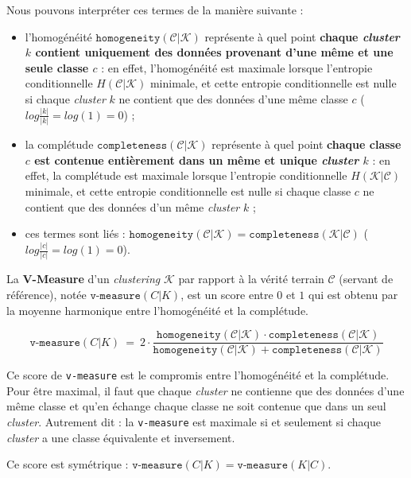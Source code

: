 		\begin{leftBarAuthorOpinion}
			Nous pouvons interpréter ces termes de la manière suivante :
			\begin{itemize}
				\item l'homogénéité $\texttt{homogeneity}(\mathcal{C}|\mathcal{K})$ représente à quel point \textbf{chaque \textit{cluster} $k$ contient uniquement des données provenant d'une même et une seule classe $c$} :
				en effet, l'homogénéité est maximale lorsque l'entropie conditionnelle $H(\mathcal{C}|\mathcal{K})$ minimale, et cette entropie conditionnelle est nulle si chaque \textit{cluster} $k$ ne contient que des données d'une même classe $c$ ($log \frac{|k|}{|k|}=log(1)=0$) ;
				\item la complétude $\texttt{completeness}(\mathcal{C}|\mathcal{K})$ représente à quel point \textbf{chaque classe $c$ est contenue entièrement dans un même et unique \textit{cluster} $k$} :
				en effet, la complétude est maximale lorsque l'entropie conditionnelle $H(\mathcal{K}|\mathcal{C})$ minimale, et cette entropie conditionnelle est nulle si chaque classe $c$ ne contient que des données d'un même \textit{cluster} $k$ ;
				\item ces termes sont liés : $\texttt{homogeneity}(\mathcal{C}|\mathcal{K}) = \texttt{completeness}(\mathcal{K}|\mathcal{C})$ ($log \frac{|c|}{|c|}=log(1)=0$).
			\end{itemize}
		\end{leftBarAuthorOpinion}
		
		
		La \textbf{V-Measure} d'un \textit{clustering} $\mathcal{K}$ par rapport à la vérité terrain $\mathcal{C}$ (servant de référence), notée $\texttt{v-measure}(C|K)$, est un score entre $0$ et $1$ qui est obtenu par la moyenne harmonique entre l'homogénéité et la complétude.
		
		\begin{equation}
			\label{equation:D.1-ANNEXE-EVALUATION-CLUSTERING-DEFINITION-VMEASURE}
			\texttt{v-measure}(C|K)~=~2 \cdot \frac{
				\texttt{homogeneity}(\mathcal{C}|\mathcal{K}) \cdot \texttt{completeness}(\mathcal{C}|\mathcal{K})
			}{
				\texttt{homogeneity}(\mathcal{C}|\mathcal{K}) + \texttt{completeness}(\mathcal{C}|\mathcal{K})
			}
		\end{equation}
		
		\begin{leftBarAuthorOpinion}
			Ce score de \texttt{v-measure} est le compromis entre l'homogénéité et la complétude.
			Pour être maximal, il faut que chaque \textit{cluster} ne contienne que des données d'une même classe et qu'en échange chaque classe ne soit contenue que dans un seul \textit{cluster}.
			Autrement dit : la \texttt{v-measure} est maximale si et seulement si chaque \textit{cluster} a une classe équivalente et inversement.
			
			Ce score est symétrique : $\texttt{v-measure}(C|K) = \texttt{v-measure}(K|C)$.
		\end{leftBarAuthorOpinion}

